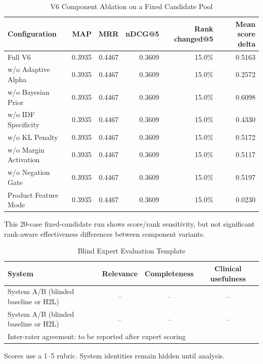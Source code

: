 \begin{table}[t]
\centering
\caption{V6 Component Ablation on a Fixed Candidate Pool}
\label{tab:v6_ablation}
\begin{tabular}{lrrrrr}
\toprule
Configuration & MAP & MRR & nDCG@5 & Rank changed@5 & Mean score delta \\
\midrule
Full V6 & 0.3935 & 0.4467 & 0.3609 & 15.0\% & 0.5163 \\
w/o Adaptive Alpha & 0.3935 & 0.4467 & 0.3609 & 15.0\% & 0.2572 \\
w/o Bayesian Prior & 0.3935 & 0.4467 & 0.3609 & 15.0\% & 0.6098 \\
w/o IDF Specificity & 0.3935 & 0.4467 & 0.3609 & 15.0\% & 0.4330 \\
w/o KL Penalty & 0.3935 & 0.4467 & 0.3609 & 15.0\% & 0.5172 \\
w/o Margin Activation & 0.3935 & 0.4467 & 0.3609 & 15.0\% & 0.5117 \\
w/o Negation Gate & 0.3935 & 0.4467 & 0.3609 & 15.0\% & 0.5197 \\
Product Feature Mode & 0.3935 & 0.4467 & 0.3609 & 15.0\% & 0.0230 \\
\bottomrule
\end{tabular}
\vspace{1mm}
\footnotesize{This 20-case fixed-candidate run shows score/rank sensitivity, but not significant rank-aware effectiveness differences between component variants.}
\end{table}

\begin{table}[t]
\centering
\caption{Blind Expert Evaluation Template}
\label{tab:human_eval}
\begin{tabular}{lccc}
\toprule
System & Relevance & Completeness & Clinical usefulness \\
\midrule
System A/B (blinded baseline or H2L) & -- & -- & -- \\
System A/B (blinded baseline or H2L) & -- & -- & -- \\
\midrule
\multicolumn{4}{l}{Inter-rater agreement: to be reported after expert scoring} \\
\bottomrule
\end{tabular}
\vspace{1mm}
\footnotesize{Scores use a 1--5 rubric. System identities remain hidden until analysis.}
\end{table}
